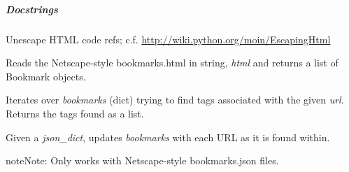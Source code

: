 \documentclass[letterpaper,10pt,openany]{sphinxmanual}
\begin{document}
\subparagraph{Docstrings}
\label{Applications/terminal/plugin_bookmarks:docstrings}

\begin{fulllineitems}
\label{Applications/terminal/plugin_bookmarks:bookmarks.unescape}
Unescape HTML code refs; c.f. \href{http://wiki.python.org/moin/EscapingHtml}{http://wiki.python.org/moin/EscapingHtml}

\end{fulllineitems}


\begin{fulllineitems}
\label{Applications/terminal/plugin_bookmarks:bookmarks.parse_bookmarks_html}
Reads the Netscape-style bookmarks.html in string, \emph{html} and returns a
list of Bookmark objects.

\end{fulllineitems}


\begin{fulllineitems}
\label{Applications/terminal/plugin_bookmarks:bookmarks.get_json_tags}
Iterates over \emph{bookmarks} (dict) trying to find tags associated with the
given \emph{url}.  Returns the tags found as a list.

\end{fulllineitems}


\begin{fulllineitems}
\label{Applications/terminal/plugin_bookmarks:bookmarks.get_ns_json_bookmarks}
Given a \emph{json\_dict}, updates \emph{bookmarks} with each URL as it is found
within.

\begin{notice}{note}{Note:}
Only works with Netscape-style bookmarks.json files.
\end{notice}

\end{fulllineitems}
\end{document}
